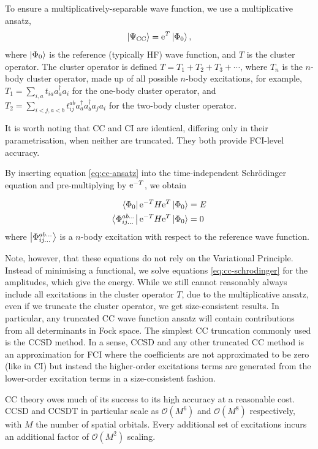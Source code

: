 To ensure a multiplicatively-separable wave function, we use a multiplicative ansatz,
\begin{equation}
    \label{eq:cc-ansatz}
\ket{\Psi_\mathrm{CC}} = \mathrm{e}^T\ket{\Phi_0},
\end{equation}
where $\ket{\Phi_0}$ is the reference (typically \gls{HF}) wave function, and $T$ is the cluster operator. The cluster operator is defined $T = T_1 + T_2 + T_3 + \cdots$, where $T_n$ is the $n$-body cluster operator, made up of all possible $n$-body excitations, for example, $T_1 = \sum_{i,a}t_{ia}a_a^\dag a_i$ for the one-body cluster operator, and $T_2 = \sum_{i<j,a<b}t_{ij}^{ab}a_a^\dag a_b^\dag a_j a_i$ for the two-body cluster operator.

It is worth noting that \gls{CC} and \gls{CI} are identical, differing only in their parametrisation, when neither are truncated. They both provide \gls{FCI}-level accuracy.

By inserting equation \ref{eq:cc-ansatz} into the time-independent Schr\"odinger equation and pre-multiplying by $\mathrm{e}^{-T}$, we obtain

\begin{align}
    \bra{\Phi_0}\mathrm{e}^{-T} H \mathrm{e}^T\ket{\Phi_0} &= E \\
    \label{eq:cc-schrodinger}
    \bra{\Phi_{ij...}^{ab...}}\mathrm{e}^{-T} H \mathrm{e}^T\ket{\Phi_0} &= 0
\end{align}
where $\ket{\Phi_{ij...}^{ab...}}$ is a $n$-body excitation with respect to the reference wave function.

Note, however, that these equations do not rely on the Variational Principle. Instead of minimising a functional, we solve equations \ref{eq:cc-schrodinger} for the amplitudes, which give the energy. While we still cannot reasonably always include all excitations in the cluster operator $T$, due to the multiplicative ansatz, even if we truncate the cluster operator, we get size-consistent results. In particular, any truncated CC wave function ansatz will contain contributions from all determinants in Fock space. The simplest CC truncation commonly used is the \gls{CCSD} method. In a sense, \gls{CCSD} and any other truncated CC method is an approximation for \gls{FCI} where the coefficients are not approximated to be zero (like in \gls{CI}) but instead the higher-order excitations terms are generated from the lower-order excitation terms in a size-consistent fashion.

CC theory owes much of its success to its high accuracy at a reasonable cost. \gls{CCSD} and \gls{CCSDT} in particular scale as $\mathcal{O}(M^6)$ and $\mathcal{O}(M^8)$ respectively, with $M$ the number of spatial orbitals. Every additional set of excitations incurs an additional factor of $\mathcal{O}(M^2)$ scaling.

